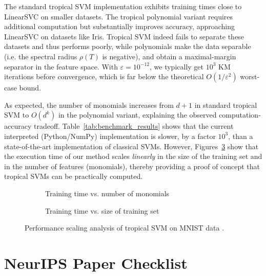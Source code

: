 \documentclass{article}
\begin{document}
The standard tropical SVM implementation exhibits training times close to LinearSVC on smaller datasets. The tropical polynomial variant requires additional computation but substantially improves accuracy, approaching LinearSVC on datasets like Iris.
Tropical SVM indeed fails to separate these datasets and thus performs poorly, while polynomials make the data separable (i.e. the spectral radius $\rho(T)$ is negative), and obtain a maximal-margin separator in the feature space.
With $\varepsilon = 10^{-12}$, we typically get $10^3$ KM iterations before convergence, which is far below the theoretical $O(1/\varepsilon^2)$ worst-case bound.

As expected, the number of monomials increases from $d+1$ in standard tropical SVM to $O(d^k)$ in the polynomial variant, explaining the observed computation-accuracy tradeoff. Table~\ref{tab:benchmark_results}
shows that the current interpreted (Python/NumPy) implementation is slower, by a factor $10^3$, than a state-of-the-art implementation of classical SVMs. However, Figures~\ref{fig:scaling_analysis} show that the execution time of our method scales {\em linearly} in the size of the training set and in the number of features (monomials), thereby providing
a proof of concept that tropical SVMs can be practically computed.


\begin{figure}[htbp]
    \centering
    \begin{subfigure}{0.48\textwidth}
        \centering
        \resizebox{0.95\textwidth}{!}{}
        \caption{Training time vs. number of monomials}
        \label{fig:pca_degree_scaling}
    \end{subfigure}
    \hfill
    \begin{subfigure}{0.48\textwidth}
        \centering
        \resizebox{0.95\textwidth}{!}{}
        \caption{Training time vs. size of training set}
        \label{fig:sample_size_scaling}
    \end{subfigure}
    \caption{Performance scaling analysis of tropical SVM on MNIST data \cite{MNIST}.}
    \label{fig:scaling_analysis}
\end{figure}


\newpage
\section*{NeurIPS Paper Checklist}
\end{document}
